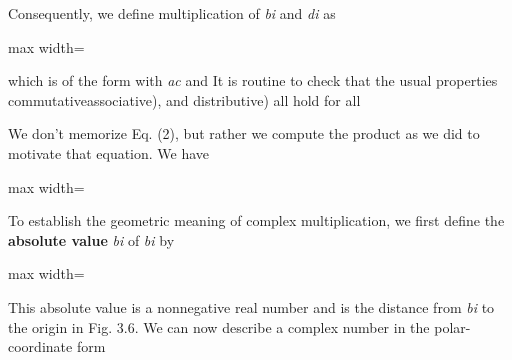 \documentclass[11pt,oneside]{article}
\begin{document}
\begin{BookBody}
\noindent Consequently, we define multiplication of  \textit{bi} and  \textit{di} as

\begin{center}\begin{adjustbox}{max width=\linewidth}\end{adjustbox}\end{center}

\noindent which is of the form  with  \textit{ac}  and  It is routine to check that the usual properties commutativeassociative), and distributive) all hold for all 



 We don’t memorize Eq. (2), but rather we compute the product as we did to motivate that equation. We have

\begin{center}\begin{adjustbox}{max width=\linewidth}\end{adjustbox}\end{center}

\noindent To establish the geometric meaning of complex multiplication, we first define the\textbf{ abso}\textbf{lute value}  \textit{bi}\BookInline{|} of  \textit{bi} by

\begin{center}\begin{adjustbox}{max width=\linewidth}\end{adjustbox}\end{center}

\noindent This absolute value is a nonnegative real number and is the distance from  \textit{bi} to the origin in Fig. 3.6. We can now describe a complex number  in the polar-coordinate form


\end{BookBody}
\end{document}
